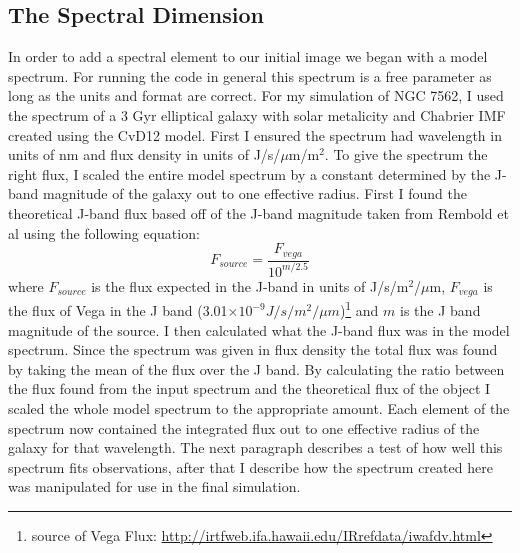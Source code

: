 \documentclass[11pt,twoside]{article}
\begin{document}
\subsection{The Spectral Dimension} \label{spectral_sect}
In order to add a spectral element to our initial image we began with a model spectrum. For running the code in general this spectrum is a free parameter as long as the units and format are correct. For my simulation of NGC 7562, I used the spectrum of a 3 Gyr elliptical galaxy with solar metalicity and Chabrier IMF created using the CvD12 model. First I ensured the spectrum had wavelength in units of nm and flux density in units of J/s/$\mu$m/m$^2$. To give the spectrum the right flux, I scaled the entire model spectrum by a constant determined by the J-band magnitude of the galaxy out to one effective radius. First I found the theoretical J-band flux based off of the J-band magnitude taken from Rembold et al\cite{Rembold}  using the following equation: \begin{equation} F_{source}=\frac{F_{vega}}{10^{m/2.5}} \end{equation} where $F_{source}$ is the flux expected in the J-band in units of J/s/m$^2$/$\mu$m, $F_{vega}$ is the flux of Vega in the J band (3.01$\times 10^{-9}J/s/m^2/\mu m$)\footnote{source of Vega Flux: \url{http://irtfweb.ifa.hawaii.edu/IRrefdata/iwafdv.html}} and $m$ is the J band magnitude of the source. I then calculated what the J-band flux was in the model spectrum. Since the spectrum was given in flux density the total flux was found by taking the mean of the flux  over the J band. By calculating the ratio between the flux found from the input spectrum and the theoretical flux of the object I scaled the whole model spectrum to the appropriate amount. Each element of the spectrum now contained the integrated flux out to one effective radius of the galaxy for that wavelength. The next paragraph describes a test of how well this spectrum fits observations, after that I describe how the spectrum created here was manipulated for use in the final simulation.
\end{document}
